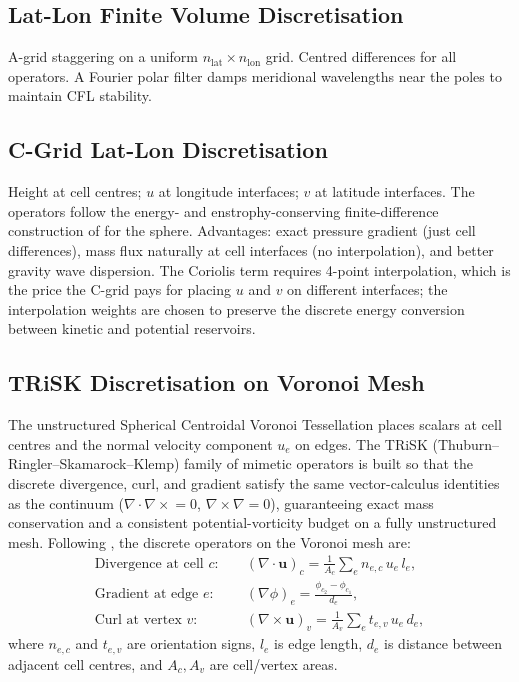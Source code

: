 \documentclass[11pt,twoside]{report}
\newcommand{\vect}[1]{\bm{#1}}
\newcommand{\grad}{\nabla}
\newcommand{\divg}{\nabla\!\cdot\!}
\newcommand{\curl}{\nabla\!\times\!}
\begin{document}
\subsection{Lat-Lon Finite Volume Discretisation}

A-grid staggering on a uniform $n_{\mathrm{lat}}\times n_{\mathrm{lon}}$
grid.  Centred differences for all operators.  A Fourier polar filter
damps meridional wavelengths near the poles to maintain CFL stability.

\subsection{C-Grid Lat-Lon Discretisation}

Height at cell centres; $u$ at longitude interfaces; $v$ at latitude
interfaces.  The operators follow the energy- and enstrophy-conserving
finite-difference construction of \citet{Sadourny1972} for the sphere.
Advantages: exact pressure gradient (just cell differences),
mass flux naturally at cell interfaces (no interpolation), and better
gravity wave dispersion.  The Coriolis term requires 4-point interpolation,
which is the price the C-grid pays for placing $u$ and $v$ on different
interfaces; the interpolation weights are chosen to preserve the discrete
energy conversion between kinetic and potential reservoirs.

\subsection{TRiSK Discretisation on Voronoi Mesh}

The unstructured Spherical Centroidal Voronoi Tessellation places scalars at
cell centres and the normal velocity component $u_e$ on edges. The TRiSK
(Thuburn--Ringler--Skamarock--Klemp) family of mimetic operators
\citep{Thuburn2009,Ringler2010} is built so that the discrete divergence, curl,
and gradient satisfy the same vector-calculus identities as the continuum
($\divg\curl=0$, $\curl\grad=0$), guaranteeing exact mass conservation and a
consistent potential-vorticity budget on a fully unstructured mesh. Following
\citet{Ringler2010}, the discrete operators on the Voronoi mesh are:
\begin{align}
  \text{Divergence at cell } c: &\quad
    (\divg\vect{u})_c = \frac{1}{A_c}\sum_e n_{e,c}\,u_e\,l_e, \\
  \text{Gradient at edge } e: &\quad
    (\grad\phi)_e = \frac{\phi_{c_2}-\phi_{c_1}}{d_e}, \\
  \text{Curl at vertex } v: &\quad
    (\curl\vect{u})_v = \frac{1}{A_v}\sum_e t_{e,v}\,u_e\,d_e,
\end{align}
where $n_{e,c}$ and $t_{e,v}$ are orientation signs, $l_e$ is edge length,
$d_e$ is distance between adjacent cell centres, and $A_c,A_v$ are
cell/vertex areas.
\end{document}
